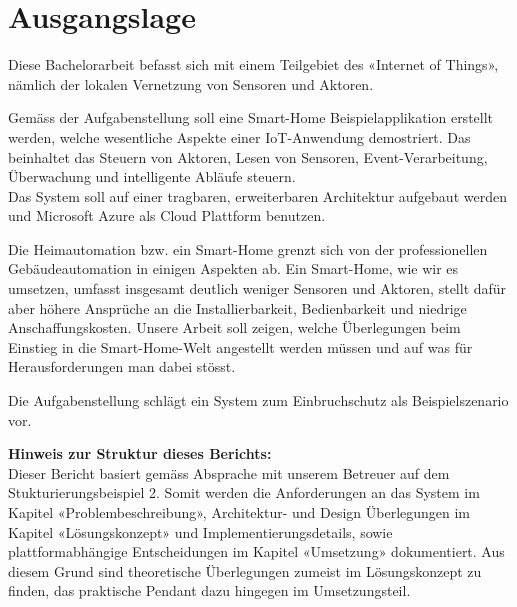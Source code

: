 \section{Ausgangslage}
Diese Bachelorarbeit befasst sich mit einem Teilgebiet des «Internet of Things», nämlich der lokalen Vernetzung von Sensoren und Aktoren.

Gemäss der Aufgabenstellung soll eine Smart-Home Beispielapplikation erstellt werden, welche wesentliche Aspekte  einer IoT-Anwendung demostriert. Das beinhaltet das Steuern von Aktoren, Lesen von Sensoren, Event-Verarbeitung, Überwachung und intelligente Abläufe steuern. \\
Das System soll auf einer tragbaren, erweiterbaren Architektur aufgebaut werden und Microsoft Azure als Cloud Plattform benutzen.

Die Heimautomation bzw. ein Smart-Home grenzt sich von der professionellen Gebäudeautomation in einigen Aspekten ab. Ein Smart-Home, wie wir es umsetzen, umfasst insgesamt deutlich weniger Sensoren und Aktoren, stellt dafür aber höhere Ansprüche an die Installierbarkeit, Bedienbarkeit und niedrige Anschaffungskosten. Unsere Arbeit soll zeigen, welche Überlegungen beim Einstieg in die Smart-Home-Welt angestellt werden müssen und auf was für Herausforderungen man dabei stösst.

Die Aufgabenstellung schlägt ein System zum Einbruchschutz als Beispielszenario vor.


\textbf{Hinweis zur Struktur dieses Berichts:}\\
Dieser Bericht basiert gemäss Absprache mit unserem Betreuer auf dem Stukturierungsbeispiel 2. Somit werden die Anforderungen an das System im Kapitel «Problembeschreibung», Architektur- und Design Überlegungen im Kapitel «Lösungskonzept» und Implementierungsdetails, sowie plattformabhängige Entscheidungen im Kapitel «Umsetzung» dokumentiert. Aus diesem Grund sind theoretische Überlegungen zumeist im Lösungskonzept zu finden, das praktische Pendant dazu hingegen im Umsetzungsteil.
